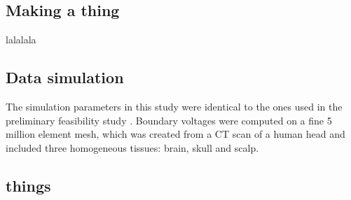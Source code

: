 \subsection{Making a thing}

lalalala 
\subsection{Data simulation}

The simulation parameters in this study were identical to the ones used in the preliminary feasibility study \citep{Malone2014}. Boundary voltages were computed on a fine 5 million element mesh, which was created from a CT scan of a human head and included three homogeneous tissues: brain, skull and scalp. 


%


\subsection{things}

